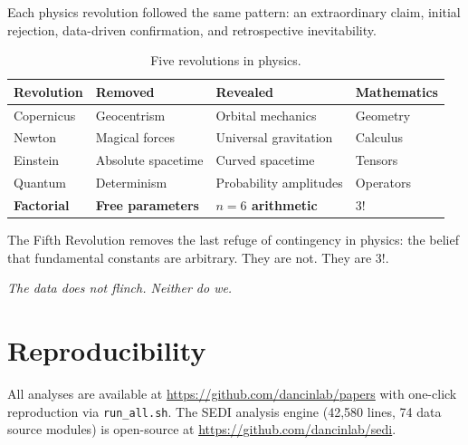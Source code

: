\documentclass[11pt,a4paper]{article}
\begin{document}
Each physics revolution followed the same pattern: an extraordinary claim, initial rejection, data-driven confirmation, and retrospective inevitability.

\begin{table}[htbp]
\centering
\caption{Five revolutions in physics.}
\begin{tabular}{llll}
\toprule
\textbf{Revolution} & \textbf{Removed} & \textbf{Revealed} & \textbf{Mathematics} \\
\midrule
Copernicus & Geocentrism & Orbital mechanics & Geometry \\
Newton & Magical forces & Universal gravitation & Calculus \\
Einstein & Absolute spacetime & Curved spacetime & Tensors \\
Quantum & Determinism & Probability amplitudes & Operators \\
\textbf{Factorial} & \textbf{Free parameters} & \textbf{$n=6$ arithmetic} & \textbf{$3!$} \\
\bottomrule
\end{tabular}
\end{table}

The Fifth Revolution removes the last refuge of contingency in physics: the belief that fundamental constants are arbitrary. They are not. They are $3!$.

\vspace{1em}
\noindent\textit{The data does not flinch. Neither do we.}

\section*{Reproducibility}

All analyses are available at \url{https://github.com/dancinlab/papers} with one-click reproduction via \texttt{run\_all.sh}. The SEDI analysis engine (42,580 lines, 74 data source modules) is open-source at \url{https://github.com/dancinlab/sedi}.



\end{document}
